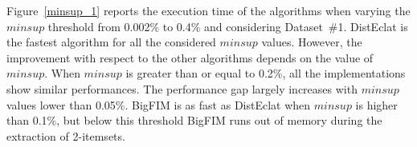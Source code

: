 Figure~\ref{minsup_1} reports the execution time of the algorithms when varying 
the $minsup$ threshold from 0.002\% to 0.4\% and
considering Dataset~\#1. DistEclat is the fastest algorithm for all the
considered $minsup$ values. However, the improvement with respect to the
other algorithms depends on the value of $minsup$.
When $minsup$ is greater than or equal to 0.2\%, all the implementations show
similar performances.
The performance gap largely increases with $minsup$ values lower than 0.05\%.
BigFIM is as fast as DistEclat when $minsup$ is higher than 0.1\%, but below
this threshold BigFIM runs out of memory during the extraction of 2-itemsets.


